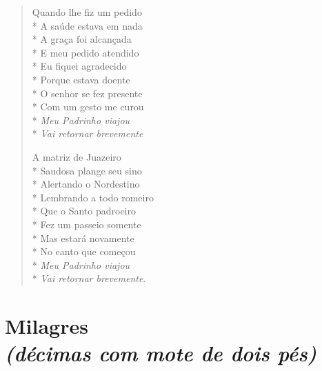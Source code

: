 \begin{verse}
Quando lhe fiz um pedido\\*
A saúde estava em nada\\*
A graça foi alcançada\\*
E meu pedido atendido\\*
Eu fiquei agradecido\\*
Porque estava doente\\*
O senhor se fez presente\\*
Com um gesto me curou\\*
\textit{Meu Padrinho viajou}\\*
\textit{Vai retornar brevemente}

A matriz de Juazeiro\\*
Saudosa plange seu sino\\*
Alertando o Nordestino\\*
Lembrando a todo romeiro\\*
Que o Santo padroeiro\\*
Fez um passeio somente\\*
Mas estará novamente\\*
No canto que começou\\*
\textit{Meu Padrinho viajou}\\*
\textit{Vai retornar brevemente}.
\end{verse}


\chapter[Milagres]{Milagres\\\smallskip\textit{(décimas com mote de dois pés)}}

